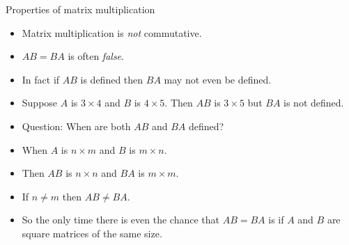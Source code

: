 \documentclass{beamer}
\begin{document}

\begin{frame}{Properties of matrix multiplication}

\begin{itemize}
\item Matrix multiplication is \emph{not} commutative.
\item $A B = B A$ is often \emph{false}.
\item In fact if $A B$ is defined then $B A$ may not even be defined.
\item Suppose $A$ is $3\times 4$ and $B$ is $4\times 5$. Then $A B$
is $3\times 5$ but $B A$ is not defined.
\item Question: When are both $A B$ and $B A$ defined?
\item When $A$ is $n\times m$ and $B$ is $m\times n$.
\item Then $A B$ is $n \times n$ and $B A$ is $m\times m$.
\item If $n\not= m$ then $A B \not= B A$.
\item So the only time there is even the chance that $A B = B A$ is
if $A$ and $B$ are square matrices of the same size.

\end{itemize}

\end{frame}

\end{document}
